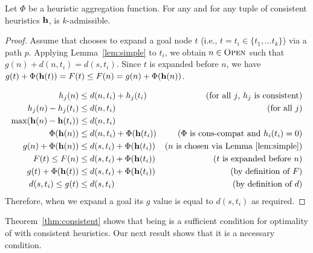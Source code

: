 \begin{theorem}
  \label{thm:consistent}
  Let $\Phi$ be a \axiomcons heuristic aggregation function.
  For any \kgs and for any tuple of consistent heuristics $\mathbf{h}$, \kastarphi is $k$-admissible.
\end{theorem}
\begin{proof}
  Assume that \kastar chooses to expand a goal node $t$ (i.e., $t = t_i \in \{t_1, \ldots t_k\}$) via a path $p$.
  Applying Lemma~\ref{lem:simple} to $t_i$, we obtain $n\in \textsc{Open}$ such that $g(n) + d(n, t_i) = d(s, t_i)$.
  Since $t$ is expanded before $n$, we have $g(t) + \Phi(\mathbf{h}(t)) = F(t) \leq F(n) = g(n) + \Phi(\mathbf{h}(n))$.

  \begin{align}
    h_j(n)                             & \leq d(n, t_i) + h_j(t_i) & \text{(for all $j$, $h_j$ is consistent)}\\
    h_j(n) - h_j(t_i)                  & \leq d(n, t_i)              & \text{(for all $j$)}\\
    \max (\vect{h}(n) - \vect{h}(t_i)) & \leq d(n, t_i)              & \text{}\\
    \Phi(\vect{h}(n))                  & \leq d(n, t_i) + \Phi(\vect{h}(t_i)) & \text{($\Phi$ is \axiomcons and $h_i(t_i) = 0$)}\\
    g(n) + \Phi(\vect{h}(n))           & \leq d(s, t_i) + \Phi(\vect{h}(t_i)) & \text{($n$ is chosen via Lemma~\ref{lem:simple})}\\
    F(t) \leq F(n)                     & \leq d(s, t_i) + \Phi(\vect{h}(t_i)) & \text{($t$ is expanded before $n$)}\\
    g(t) + \Phi(\vect{h}(t))           & \leq d(s, t_i) + \Phi(\vect{h}(t_i)) & \text{(by definition of $F$)}\\
    d(s, t_i) \leq g(t)                & \leq d(s, t_i) & \text{(by definition of $d$)}
    \label{eq:consistent}
  \end{align}
  Therefore, when we expand a goal its $g$ value is equal to $d(s, t_i)$ as required.
\end{proof}

Theorem~\ref{thm:consistent} shows that being \axiomcons is a sufficient condition for optimality of \kastarphi with consistent heuristics.
Our next result shows that it is a necessary condition.

